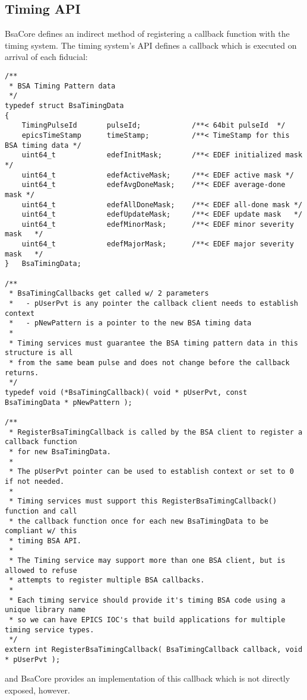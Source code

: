 \documentclass[11pt]{article}
\newcommand{\bsac}{BsaCore}
\begin{document}
\subsection{Timing API}
\bsac{} defines an indirect method of registering a callback function with the timing system.
The timing system's API defines a callback which is executed on arrival of each fiducial:
\begin{lstlisting}
/**
 * BSA Timing Pattern data
 */
typedef struct BsaTimingData
{
    TimingPulseId       pulseId;            /**< 64bit pulseId  */
    epicsTimeStamp      timeStamp;          /**< TimeStamp for this BSA timing data */
    uint64_t            edefInitMask;       /**< EDEF initialized mask  */
    uint64_t            edefActiveMask;     /**< EDEF active mask */
    uint64_t            edefAvgDoneMask;    /**< EDEF average-done mask */
    uint64_t            edefAllDoneMask;    /**< EDEF all-done mask */
    uint64_t            edefUpdateMask;     /**< EDEF update mask   */
    uint64_t            edefMinorMask;      /**< EDEF minor severity mask   */
    uint64_t            edefMajorMask;      /**< EDEF major severity mask   */
}   BsaTimingData;

/**
 * BsaTimingCallbacks get called w/ 2 parameters
 *   - pUserPvt is any pointer the callback client needs to establish context
 *   - pNewPattern is a pointer to the new BSA timing data
 *
 * Timing services must guarantee the BSA timing pattern data in this structure is all
 * from the same beam pulse and does not change before the callback returns.
 */
typedef void (*BsaTimingCallback)( void * pUserPvt, const BsaTimingData * pNewPattern );

/**
 * RegisterBsaTimingCallback is called by the BSA client to register a callback function
 * for new BsaTimingData.
 *
 * The pUserPvt pointer can be used to establish context or set to 0 if not needed.
 *
 * Timing services must support this RegisterBsaTimingCallback() function and call
 * the callback function once for each new BsaTimingData to be compliant w/ this
 * timing BSA API.
 *
 * The Timing service may support more than one BSA client, but is allowed to refuse
 * attempts to register multiple BSA callbacks.
 *
 * Each timing service should provide it's timing BSA code using a unique library name
 * so we can have EPICS IOC's that build applications for multiple timing service types.
 */
extern int RegisterBsaTimingCallback( BsaTimingCallback callback, void * pUserPvt );
\end{lstlisting}
and \bsac{} provides an implementation of this callback which is not directly exposed, however.
\end{document}
